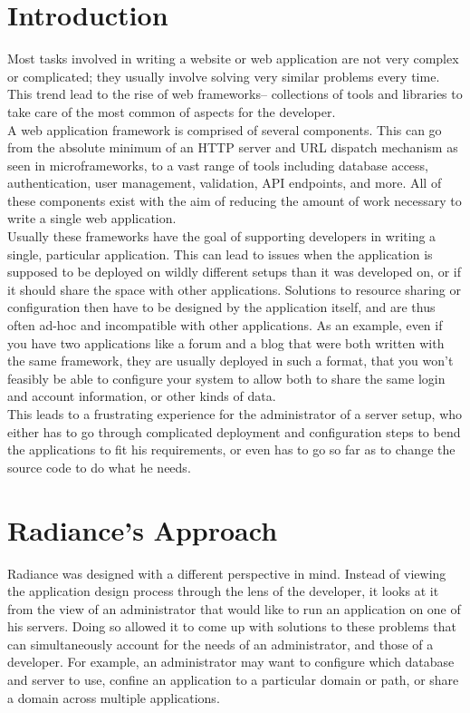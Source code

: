 \documentclass{sig-alternate}
\begin{document}
\printccsdesc

\newpage

\section{Introduction}
Most tasks involved in writing a website or web application are not very complex or complicated; they usually involve solving very similar problems every time. This trend lead to the rise of web frameworks-- collections of tools and libraries to take care of the most common of aspects for the developer. \\

A web application framework is comprised of several components. This can go from the absolute minimum of an HTTP server and URL dispatch mechanism as seen in microframeworks\cite{microframeworks}, to a vast range of tools including database access, authentication, user management, validation, API endpoints, and more. All of these components exist with the aim of reducing the amount of work necessary to write a single web application. \\

Usually these frameworks have the goal of supporting developers in writing a single, particular application. This can lead to issues when the application is supposed to be deployed on wildly different setups than it was developed on, or if it should share the space with other applications. Solutions to resource sharing or configuration then have to be designed by the application itself, and are thus often ad-hoc and incompatible with other applications. As an example, even if you have two applications like a forum and a blog that were both written with the same framework, they are usually deployed in such a format, that you won't feasibly be able to configure your system to allow both to share the same login and account information, or other kinds of data. \\

This leads to a frustrating experience for the administrator of a server setup, who either has to go through complicated deployment and configuration steps to bend the applications to fit his requirements, or even has to go so far as to change the source code to do what he needs.

\section{Radiance's Approach}
Radiance was designed with a different perspective in mind. Instead of viewing the application design process through the lens of the developer, it looks at it from the view of an administrator that would like to run an application on one of his servers. Doing so allowed it to come up with solutions to these problems that can simultaneously account for the needs of an administrator, and those of a developer. For example, an administrator may want to configure which database and server to use, confine an application to a particular domain or path, or share a domain across multiple applications. \\
\end{document}
